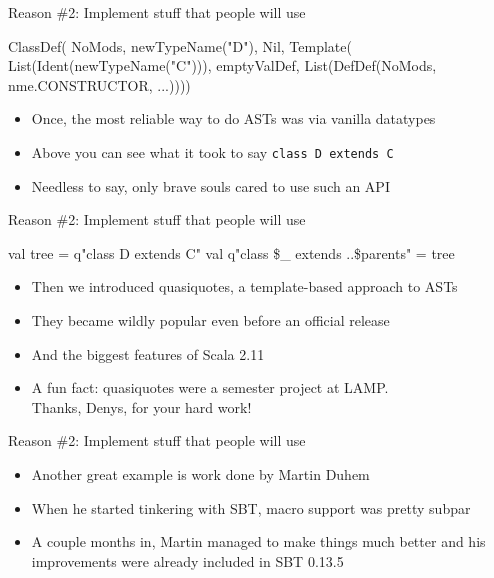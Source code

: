 \documentclass[svgnames,dvipsnames,hyperref={bookmarks=false},usepdftitle=false]{beamer}
\begin{document}
\begin{frame}[fragile]{Reason \#2: Implement stuff that people will use}
\begin{semiverbatim}
ClassDef(
  NoMods,
  newTypeName("D"),
  Nil,
  Template(
    List(Ident(newTypeName("C"))),
    emptyValDef,
    List(DefDef(NoMods, nme.CONSTRUCTOR, ...))))

\end{semiverbatim}
\begin{itemize}
\item Once, the most reliable way to do ASTs was via vanilla datatypes
\item Above you can see what it took to say \texttt{class D extends C}
\item Needless to say, only brave souls cared to use such an API
\end{itemize}
\end{frame}

\begin{frame}[fragile]{Reason \#2: Implement stuff that people will use}
\begin{semiverbatim}
val tree = q"class D extends C"
val q"class \$_ extends ..\$parents" = tree

\end{semiverbatim}
\begin{itemize}
\item Then we introduced quasiquotes, a template-based approach to ASTs
\item They became wildly popular even before an official release
\item And the biggest features of Scala 2.11
\item \alert{A fun fact: quasiquotes were a semester project at LAMP.\\ Thanks, Denys, for your hard work!}
\end{itemize}
\end{frame}

\begin{frame}{Reason \#2: Implement stuff that people will use}
\begin{itemize}
\item Another great example is work done by Martin Duhem
\item When he started tinkering with SBT, macro support was pretty subpar
\item \alert{A couple months in, Martin managed to make things much better and his improvements were already included in SBT 0.13.5}
\end{itemize}
\end{frame}
\end{document}
